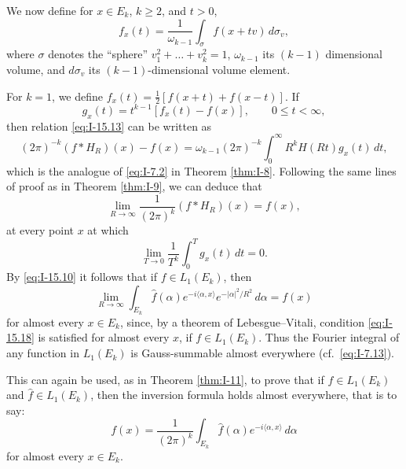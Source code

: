 We now define for $x\in E_k$, $k\ge 2$, and $t>0$,
\begin{equation}\label{eq:I-15.14}\tag{15.14}
f_x(t)=\frac{1}{\omega_{k-1}}\int_{\sigma}f(x+tv)\,d\sigma_v,
\end{equation}
where $\sigma$ denotes the ``sphere'' $v_1^{2}+\ldots+v_k^{2}=1$, $\omega_{k-1}$ its $(k-1)$ dimensional volume, and $d\sigma_v$ its $(k-1)$-dimensional volume element.

For $k=1$, we define $f_x(t)=\frac12[f(x+t)+f(x-t)]$. If
\begin{equation}\label{eq:I-15.15}\tag{15.15}
g_x(t)=t^{k-1}[f_x(t)-f(x)],\qquad 0\le t<\infty,
\end{equation}
then relation \eqref{eq:I-15.13} can be written as
\begin{equation}\label{eq:I-15.16}\tag{15.16}
(2\pi)^{-k}(f*H_R)(x)-f(x)=\omega_{k-1}(2\pi)^{-k}\int_{0}^{\infty}R^{k}H(Rt)g_x(t)\,dt,
\end{equation}
which is the analogue of \eqref{eq:I-7.2} in Theorem \ref{thm:I-8}. Following the same lines of proof as in Theorem \ref{thm:I-9}, we can deduce that
\begin{equation}\label{eq:I-15.17}\tag{15.17}
\lim_{R\to\infty}\frac{1}{(2\pi)^{k}}(f*H_R)(x)=f(x),
\end{equation}
at every point $x$ at which
\begin{equation}\label{eq:I-15.18}\tag{15.18}
\lim_{T\to 0}\frac{1}{T^{k}}\int_{0}^{T}g_x(t)\,dt=0.
\end{equation}
By \eqref{eq:I-15.10} it follows that if $f\in L_1(E_k)$, then
\begin{equation}\label{eq:I-15.19}\tag{15.19}
\lim_{R\to\infty}\int_{E_k}\widehat f(\alpha)e^{-i\langle\alpha,x\rangle}e^{-|\alpha|^{2}/R^{2}}\,d\alpha=f(x)
\end{equation}
for almost every $x\in E_k$, since, by a theorem of Lebesgue--Vitali, condition \eqref{eq:I-15.18} is satisfied for almost every $x$, if $f\in L_1(E_k)$. Thus the Fourier integral of any function in $L_1(E_k)$ is Gauss-summable almost everywhere (cf.\ \eqref{eq:I-7.13}).

This can again be used, as in Theorem \ref{thm:I-11}, to prove that if $f\in L_1(E_k)$ and $\widehat f\in L_1(E_k)$, then the inversion formula holds almost everywhere, that is to say:
\begin{equation}\label{eq:I-15.20}\tag{15.20}
f(x)=\frac{1}{(2\pi)^{k}}\int_{E_k}\widehat f(\alpha)e^{-i\langle\alpha,x\rangle}\,d\alpha
\end{equation}
for almost every $x\in E_k$.

